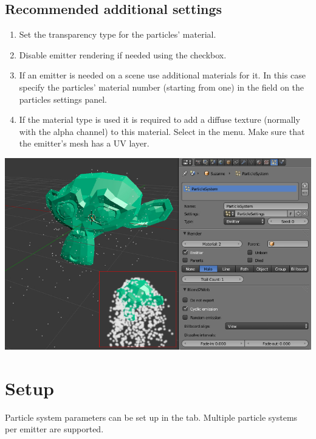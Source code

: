 \documentclass[a4paper,12pt,oneside]{sphinxmanual}
\begin{document}
\subsection{Recommended additional settings}
\label{particles:id4}\begin{enumerate}
\item {} 
Set the  transparency type for the particles' material.

\item {} 
Disable emitter rendering if needed using the  checkbox.

\item {} 
If an emitter is needed on a scene use additional materials for it. In this case specify the particles' material number (starting from one) in the  field on the particles settings panel.

\item {} 
If the  material type is used it is required to add a diffuse texture (normally with the alpha channel) to this material. Select   in the  menu.  Make sure that the emitter's mesh has a UV layer.

\end{enumerate}

{\hfill\includegraphics[width=1.000\linewidth]{particles_first_steps.jpg}\hfill}


\section{Setup}
\label{particles:id5}
Particle system parameters can be set up in the  tab. Multiple particle systems per emitter are supported.
\end{document}
